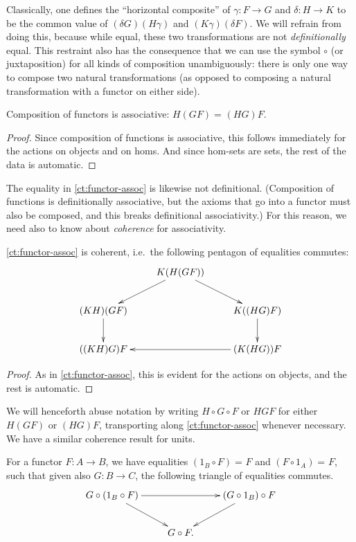 \documentclass{amsart}
\newcommand{\id}[3][]{\ensuremath{#2 =_{#1} #3}\xspace}
\theoremstyle{definition}
\theoremstyle{remark}
\numberwithin{equation}{section}
\begin{document}
Classically, one defines the ``horizontal composite'' of $\gamma:F\to G$ and $\delta:H\to K$ to be the common value of ${(\delta G)(H\gamma)}$ and ${(K\gamma)(\delta F)}$.
We will refrain from doing this, because while equal, these two transformations are not \emph{definitionally} equal.
This restraint also has the consequence that we can use the symbol $\circ$ (or juxtaposition) for all kinds of composition unambiguously: there is only one way to compose two natural transformations (as opposed to composing a natural transformation with a functor on either side).

\begin{lem}\label{ct:functor-assoc}
  Composition of functors is associative: $\id{H(GF)}{(HG)F}$.
\end{lem}
\begin{proof}
  Since composition of functions is associative, this follows immediately for the actions on objects and on homs.
  And since hom-sets are sets, the rest of the data is automatic.
\end{proof}

The equality in \autoref{ct:functor-assoc} is likewise not definitional.
(Composition of functions is definitionally associative, but the axioms that go into a functor must also be composed, and this breaks definitional associativity.)  For this reason, we need also to know about \emph{coherence} for associativity.

\begin{lem}\label{ct:pentagon}
  \autoref{ct:functor-assoc} is coherent, i.e.\ the following pentagon of equalities commutes:
  \[ \xymatrix{ & K(H(GF)) \ar[dl] \ar[dr]\\
    (KH)(GF) \ar[d] && K((HG)F) \ar[d]\\
    ((KH)G)F && (K(HG))F \ar[ll] }
  \]
\end{lem}
\begin{proof}
  As in \autoref{ct:functor-assoc}, this is evident for the actions on objects, and the rest is automatic.
\end{proof}

We will henceforth abuse notation by writing $H\circ G\circ F$ or $HGF$ for either $H(GF)$ or $(HG)F$, transporting along \autoref{ct:functor-assoc} whenever necessary.
We have a similar coherence result for units.

\begin{lem}\label{ct:units}
  For a functor $F:A\to B$, we have equalities $\id{(1_B\circ F)}{F}$ and $\id{(F\circ 1_A)}{F}$, such that given also $G:B\to C$, the following triangle of equalities commutes.
  \[ \xymatrix{
    G\circ (1_B \circ F) \ar[rr] \ar[dr] &&
    (G\circ 1_B)\circ F \ar[dl] \\
    & G \circ F.}
  \]
\end{lem}
\end{document}
